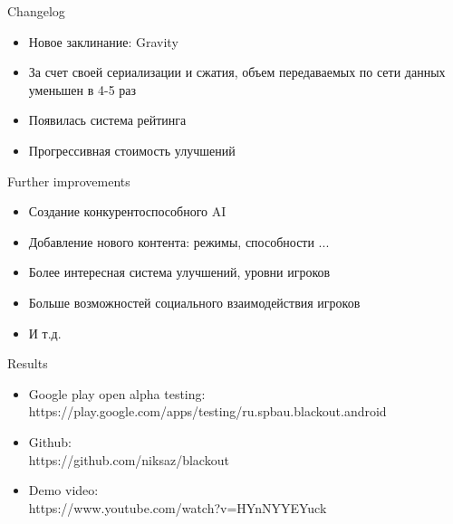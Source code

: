 \documentclass[12pt]{beamer}
\begin{document}
\begin{frame}{Changelog}
    \begin{itemize}
        \item Новое заклинание: Gravity
        \item За счет своей сериализации и сжатия, объем передаваемых по сети данных уменьшен в 4-5 раз
        \item Появилась система рейтинга
        \item Прогрессивная стоимость улучшений
    \end{itemize}
\end{frame}


\begin{frame}{Further improvements}
    \begin{itemize}
        \item <1-> Создание конкурентоспособного AI
        \item <2-> Добавление нового контента: режимы, способности ...
        \item <3-> Более интересная система улучшений, уровни игроков
        \item <4-> Больше возможностей социального взаимодействия игроков
        \item <5-> И т.д.
    \end{itemize}
\end{frame}


\begin{frame}{Results}
    \begin{itemize}
        \item Google play open alpha testing: \\ https://play.google.com/apps/testing/ru.spbau.blackout.android
        \item Github: \\
        https://github.com/niksaz/blackout
        \item Demo video: \\
        https://www.youtube.com/watch?v=HYnNYYEYuck
    \end{itemize}

\end{frame}
\end{document}
